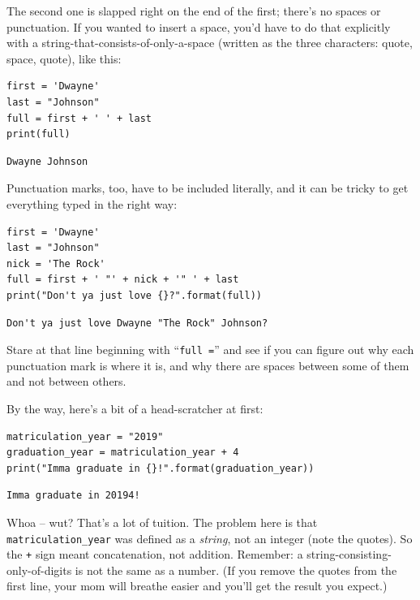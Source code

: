 The second one is slapped right on the end of the first; there's no spaces or
punctuation. If you wanted to insert a space, you'd have to do that explicitly
with a string-that-consists-of-only-a-space (written as the three characters:
quote, space, quote), like this:

\begin{Verbatim}[fontsize=\small,samepage=true,frame=single,framesep=3mm]
first = 'Dwayne'
last = "Johnson"
full = first + ' ' + last
print(full)
\end{Verbatim}

\begin{Verbatim}[fontsize=\small,samepage=true,frame=leftline,framesep=5mm,framerule=1mm]
Dwayne Johnson
\end{Verbatim}

Punctuation marks, too, have to be included literally, and it can be tricky to
get everything typed in the right way:

\begin{Verbatim}[fontsize=\small,samepage=true,frame=single,framesep=3mm]
first = 'Dwayne'
last = "Johnson"
nick = 'The Rock'
full = first + ' "' + nick + '" ' + last
print("Don't ya just love {}?".format(full))
\end{Verbatim}

\begin{Verbatim}[fontsize=\small,samepage=true,frame=leftline,framesep=5mm,framerule=1mm]
Don't ya just love Dwayne "The Rock" Johnson?
\end{Verbatim}

Stare at that line beginning with ``\texttt{full =}'' and see if you can figure
out why each punctuation mark is where it is, and why there are spaces between
some of them and not between others.

By the way, here's a bit of a head-scratcher at first:

\begin{Verbatim}[fontsize=\small,samepage=true,frame=single,framesep=3mm]
matriculation_year = "2019"
graduation_year = matriculation_year + 4
print("Imma graduate in {}!".format(graduation_year))
\end{Verbatim}

\begin{Verbatim}[fontsize=\small,samepage=true,frame=leftline,framesep=5mm,framerule=1mm]
Imma graduate in 20194!
\end{Verbatim}

Whoa -- wut? That's a lot of tuition. The problem here is that
\texttt{matriculation\_year} was defined as a \textit{string}, not an integer
(note the quotes). So the \texttt{+} sign meant concatenation, not addition.
Remember: a string-consisting-only-of-digits is not the same as a number. (If
you remove the quotes from the first line, your mom will breathe easier and
you'll get the result you expect.)

